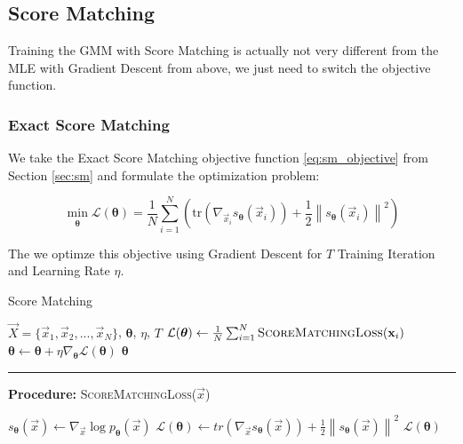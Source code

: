 \newpage
\subsection{Score Matching}
\label{sec:gmm_sm}

Training the GMM with Score Matching is actually not very different from the MLE with Gradient Descent from above, we just need 
to switch the objective function.  

\subsubsection{Exact Score Matching}

We take the Exact Score Matching objective function \ref{eq:sm_objective} from Section \ref{sec:sm} and formulate the optimization problem:

\begin{equation}
    \min_{\substack{\boldsymbol{\theta}}} \mathcal{L}(\boldsymbol{\theta}) = \frac{1}{N} \sum_{i=1}^{N} \left(\text{tr} \left( \nabla_{\vec x_i} s_{\boldsymbol{\theta}}(\vec x_i) \right) + \frac{1}{2} \left\| s_{\boldsymbol{\theta}}(\vec x_i) \right\|^2 \right)
    \label{eq:sm_optimization_problem}
\end{equation}

The we optimze this objective using Gradient Descent for $T$ Training Iteration and Learning Rate $\eta$.  

\begin{algorithm}
    \caption{Score Matching}
    \begin{algorithmic}[1]  
        \Require $\vec X = \{\vec x_1, \vec x_2, ..., \vec x_N\}$, $\boldsymbol{\theta}$, $\eta$, $T$
            \State $\mathcal{L}(\boldsymbol{\theta}) \gets \frac{1}{N} \sum_{i=1}^N \textsc{ScoreMatchingLoss}(\vec x_i)$
            \State $\boldsymbol{\theta} \gets \boldsymbol{\theta} + \eta \nabla_{\boldsymbol{\theta}} \mathcal{L}(\boldsymbol{\theta})$
        \EndFor
        \State \Return $\boldsymbol{\theta}$
        \end{algorithmic}
        \noindent\rule{\linewidth}{0.4pt} %
        \textbf{Procedure:} \textsc{ScoreMatchingLoss}($\vec x$)
        \begin{algorithmic}[1]
            \State $s_{\boldsymbol{\theta}}(\vec x) \gets \nabla_{\vec x} \log p_{\boldsymbol{\theta}}(\vec x)$
            \State $\mathcal{L}(\boldsymbol{\theta}) \gets tr(\nabla_{\vec x} s_{\boldsymbol{\theta}}(\vec x)) + \frac{1}{2} \left\| s_{\boldsymbol{\theta}}(\vec x) \right\|^2 $
            \State \Return $\mathcal{L}(\boldsymbol{\theta})$
        \end{algorithmic}
\end{algorithm}

